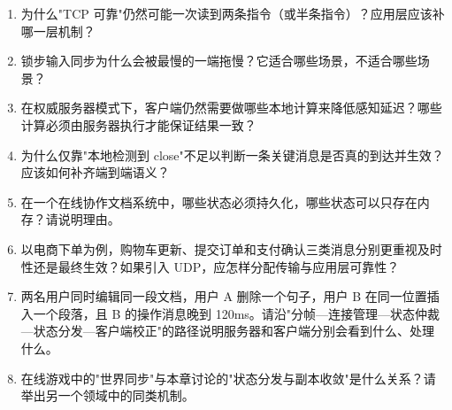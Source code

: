 \begin{tcolorbox}[breakable]
\begin{enumerate}
    \item 为什么"TCP 可靠"仍然可能一次读到两条指令（或半条指令）？应用层应该补哪一层机制？

    \item 锁步输入同步为什么会被最慢的一端拖慢？它适合哪些场景，不适合哪些场景？

    \item 在权威服务器模式下，客户端仍然需要做哪些本地计算来降低感知延迟？哪些计算必须由服务器执行才能保证结果一致？

    \item 为什么仅靠"本地检测到 close"不足以判断一条关键消息是否真的到达并生效？应该如何补齐端到端语义？

    \item 在一个在线协作文档系统中，哪些状态必须持久化，哪些状态可以只存在内存？请说明理由。

    \item 以电商下单为例，购物车更新、提交订单和支付确认三类消息分别更重视及时性还是最终生效？如果引入 UDP，应怎样分配传输与应用层可靠性？

    \item 两名用户同时编辑同一段文档，用户 A 删除一个句子，用户 B 在同一位置插入一个段落，且 B 的操作消息晚到 120ms。请沿"分帧—连接管理—状态仲裁—状态分发—客户端校正"的路径说明服务器和客户端分别会看到什么、处理什么。

    \item 在线游戏中的"世界同步"与本章讨论的"状态分发与副本收敛"是什么关系？请举出另一个领域中的同类机制。
\end{enumerate}
\end{tcolorbox}

\newpage
